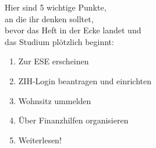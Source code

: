 
\hspace*{4em}Hier sind 5 wichtige Punkte,\\
\hspace*{8em}an die ihr denken solltet,\\
\hspace*{12em}bevor das Heft in der Ecke landet und\\
\hspace*{16em}das Studium plötzlich beginnt:\\[2em]

{
\LARGE
\hspace*{2cm}
\begin{enumerate}[label={\raisebox{.1cm}{\colorbox{gray!60}{\normalsize\textcolor{white}{\arabic*}}}}, itemsep=1cm, labelsep=.75cm, labelindent=.75cm, leftmargin=*]
  \item Zur ESE erscheinen
  \item ZIH-Login beantragen und einrichten
  \item Wohnsitz ummelden
  \item Über Finanzhilfen organisieren
  \item Weiterlesen!
\end{enumerate}
}
